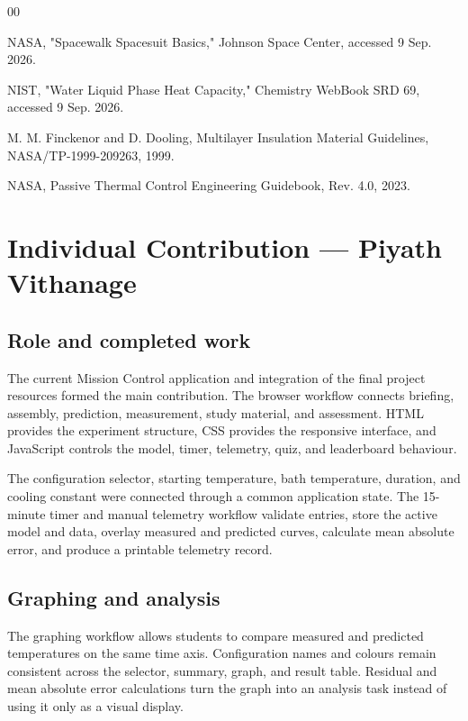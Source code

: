 \documentclass[10pt,conference,a4paper]{IEEEtran}
\begin{document}
\begin{thebibliography}{00}

 NASA, "Spacewalk Spacesuit Basics," Johnson Space Center, accessed 9 Sep. 2026.

 NIST, "Water Liquid Phase Heat Capacity," Chemistry WebBook SRD 69, accessed 9 Sep. 2026.

 M. M. Finckenor and D. Dooling, Multilayer Insulation Material Guidelines, NASA/TP-1999-209263, 1999.

 NASA, Passive Thermal Control Engineering Guidebook, Rev. 4.0, 2023.

\end{thebibliography}

\begingroup\normalsize\setlength{\parskip}{2pt}

\section*{Individual Contribution --- Piyath Vithanage}

\subsection*{Role and completed work}

The current Mission Control application and integration of the final project resources formed the main contribution. The browser workflow connects briefing, assembly, prediction, measurement, study material, and assessment. HTML provides the experiment structure, CSS provides the responsive interface, and JavaScript controls the model, timer, telemetry, quiz, and leaderboard behaviour.

The configuration selector, starting temperature, bath temperature, duration, and cooling constant were connected through a common application state. The 15-minute timer and manual telemetry workflow validate entries, store the active model and data, overlay measured and predicted curves, calculate mean absolute error, and produce a printable telemetry record.

\subsection*{Graphing and analysis}

The graphing workflow allows students to compare measured and predicted temperatures on the same time axis. Configuration names and colours remain consistent across the selector, summary, graph, and result table. Residual and mean absolute error calculations turn the graph into an analysis task instead of using it only as a visual display.
\end{document}

